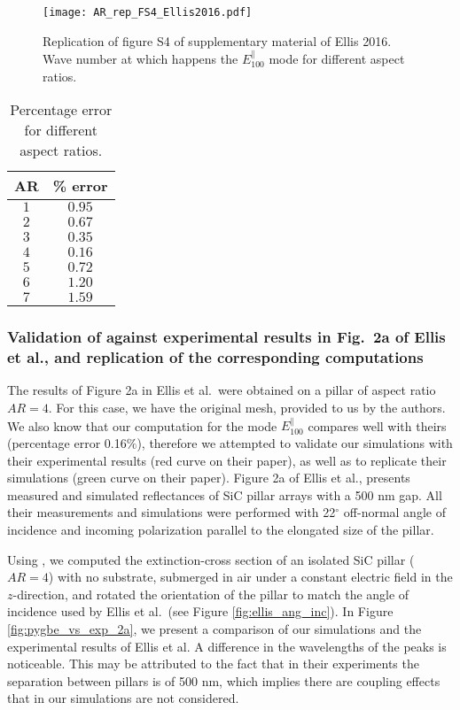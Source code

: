 \begin{figure}
    \centering
    \texttt{[image: AR\_rep\_FS4\_Ellis2016.pdf]} 
    \caption{Replication of figure S4 of supplementary material of Ellis 2016. Wave
    number at which happens the $E^{\parallel}_{100}$ mode for different aspect ratios.}
    \label{fig:rep_FS4_ellis}
 \end{figure}
 
 \begin{table}
    \centering
    \caption{Percentage error for different aspect ratios.} 
    \label{tab:err_AR}
    \begin{tabular}{c c}
    \hline%
    AR & \% error \\
    \hline%
     $1$ & $0.95$ \\
     $2$ & $0.67$ \\
     $3$ & $0.35$ \\
     $4$ & $0.16$ \\
     $5$ & $0.72$ \\
     $6$ & $1.20$ \\
     $7$ & $1.59$ \\
    \hline%
    \end{tabular}
\end{table}

\subsubsection{Validation of \pygbe against experimental results in Fig.\ 2a  of Ellis et al., and replication of the corresponding computations}

The results of Figure 2a in Ellis et al.\ were obtained on a pillar of aspect ratio $AR=4$. For this case,
we have the original mesh, provided to us by the authors. We also know that our computation 
for the mode $E^{\parallel}_{100}$ compares well with theirs (percentage error 0.16$\%$), therefore we
attempted to validate our simulations with their experimental results (red curve on their paper), as well 
as to replicate their simulations (green curve on their paper).
Figure 2a of Ellis et al., presents measured and simulated reflectances of SiC pillar
arrays with a 500 nm gap. All their measurements and simulations were performed with 
22$^\circ$ off-normal angle of incidence and incoming polarization parallel to the 
elongated size of the pillar. 

Using \pygbe, we computed the extinction-cross section of an isolated SiC pillar ($AR=4$)
with no substrate, submerged in air under a constant electric field in the $z$-direction, 
and rotated the orientation of the pillar to match the angle of incidence used by Ellis et al.\ (see Figure \ref{fig:ellis_ang_inc}).
In Figure \ref{fig:pygbe_vs_exp_2a}, we present a 
comparison of our simulations and the experimental results of Ellis et al. A 
difference in the wavelengths of the peaks is noticeable. This may be attributed to the
fact that in their experiments the separation between pillars is of 500 nm, which implies
there are coupling effects that in our simulations are not considered.  

